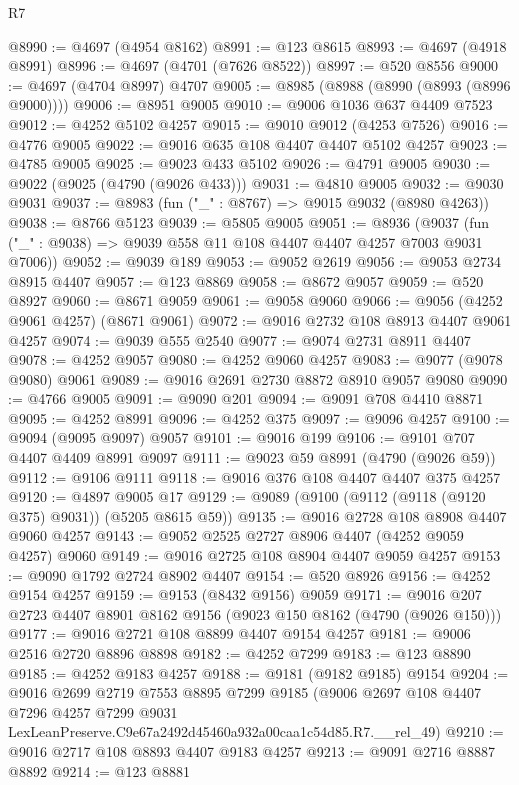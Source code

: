 \begin{lexlean}{R7}
\begin{coremodule}
@8990 := @4697 (@4954 @8162)
@8991 := @123 @8615
@8993 := @4697 (@4918 @8991)
@8996 := @4697 (@4701 (@7626 @8522))
@8997 := @520 @8556
@9000 := @4697 (@4704 @8997) @4707
@9005 := @8985 (@8988 (@8990 (@8993 (@8996 @9000))))
@9006 := @8951 @9005
@9010 := @9006 @1036 @637 @4409 @7523
@9012 := @4252 @5102 @4257
@9015 := @9010 @9012 (@4253 @7526)
@9016 := @4776 @9005
@9022 := @9016 @635 @108 @4407 @4407 @5102 @4257
@9023 := @4785 @9005
@9025 := @9023 @433 @5102
@9026 := @4791 @9005
@9030 := @9022 (@9025 (@4790 (@9026 @433)))
@9031 := @4810 @9005
@9032 := @9030 @9031
@9037 := @8983 (fun ("_" : @8767) => @9015 @9032 (@8980 @4263))
@9038 := @8766 @5123
@9039 := @5805 @9005
@9051 := @8936
    (@9037 (fun ("_" : @9038) => @9039 @558 @11 @108 @4407 @4407 @4257 @7003 @9031 @7006))
@9052 := @9039 @189
@9053 := @9052 @2619
@9056 := @9053 @2734 @8915 @4407
@9057 := @123 @8869
@9058 := @8672 @9057
@9059 := @520 @8927
@9060 := @8671 @9059
@9061 := @9058 @9060
@9066 := @9056 (@4252 @9061 @4257) (@8671 @9061)
@9072 := @9016 @2732 @108 @8913 @4407 @9061 @4257
@9074 := @9039 @555 @2540
@9077 := @9074 @2731 @8911 @4407
@9078 := @4252 @9057
@9080 := @4252 @9060 @4257
@9083 := @9077 (@9078 @9080) @9061
@9089 := @9016 @2691 @2730 @8872 @8910 @9057 @9080
@9090 := @4766 @9005
@9091 := @9090 @201
@9094 := @9091 @708 @4410 @8871
@9095 := @4252 @8991
@9096 := @4252 @375
@9097 := @9096 @4257
@9100 := @9094 (@9095 @9097) @9057
@9101 := @9016 @199
@9106 := @9101 @707 @4407 @4409 @8991 @9097
@9111 := @9023 @59 @8991 (@4790 (@9026 @59))
@9112 := @9106 @9111
@9118 := @9016 @376 @108 @4407 @4407 @375 @4257
@9120 := @4897 @9005 @17
@9129 := @9089 (@9100 (@9112 (@9118 (@9120 @375) @9031)) (@5205 @8615 @59))
@9135 := @9016 @2728 @108 @8908 @4407 @9060 @4257
@9143 := @9052 @2525 @2727 @8906 @4407 (@4252 @9059 @4257) @9060
@9149 := @9016 @2725 @108 @8904 @4407 @9059 @4257
@9153 := @9090 @1792 @2724 @8902 @4407
@9154 := @520 @8926
@9156 := @4252 @9154 @4257
@9159 := @9153 (@8432 @9156) @9059
@9171 := @9016 @207 @2723 @4407 @8901 @8162 @9156 (@9023 @150 @8162 (@4790 (@9026 @150)))
@9177 := @9016 @2721 @108 @8899 @4407 @9154 @4257
@9181 := @9006 @2516 @2720 @8896 @8898
@9182 := @4252 @7299
@9183 := @123 @8890
@9185 := @4252 @9183 @4257
@9188 := @9181 (@9182 @9185) @9154
@9204 := @9016
    @2699
    @2719
    @7553
    @8895
    @7299
    @9185
    (@9006
      @2697
      @108
      @4407
      @7296
      @4257
      @7299
      @9031
      LexLeanPreserve.C9e67a2492d45460a932a00caa1c54d85.R7.__rel_49)
@9210 := @9016 @2717 @108 @8893 @4407 @9183 @4257
@9213 := @9091 @2716 @8887 @8892
@9214 := @123 @8881

\end{coremodule}
\end{lexlean}

